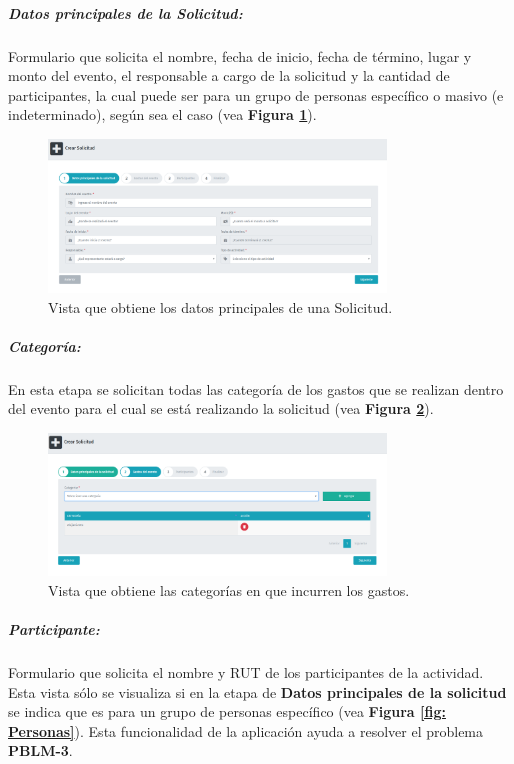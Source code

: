     \subparagraph{\emph{Datos principales de la Solicitud: }} Formulario que solicita el nombre, fecha de inicio, fecha de término, lugar y monto del evento, el responsable a cargo de la solicitud y la cantidad de participantes, la cual puede ser para un grupo de personas específico o masivo (e indeterminado), según sea el caso (vea \textbf{Figura \ref{fig: DatosPrincipales}}).

    \begin{figure}[htbp]
        \centering
        \includegraphics[width= 0.8\textwidth]{Imagenes/DatosPrincipales.PNG}
        \caption{\label{fig: DatosPrincipales}Vista que obtiene los datos principales de una Solicitud.}
    \end{figure}

    \subparagraph{\emph{Categoría: }} En esta etapa se solicitan todas las categoría de los gastos que se realizan dentro del evento para el cual se está realizando la solicitud (vea \textbf{Figura \ref{fig: Categorias}}).

    \begin{figure}[htbp]
        \centering
        \includegraphics[width= 0.8\textwidth]{Imagenes/Categoria.PNG}
        \caption{\label{fig: Categorias}Vista que obtiene las categorías en que incurren los gastos.}
    \end{figure}

    \subparagraph{\emph{Participante: }} Formulario que solicita el nombre y RUT de los participantes de la actividad. Esta vista sólo se visualiza si en la etapa de \textbf{Datos principales de la solicitud} se indica que es para un grupo de personas específico (vea \textbf{Figura \ref{fig: Personas}}). Esta funcionalidad de la aplicación ayuda a resolver el problema \textbf{PBLM-3}.

